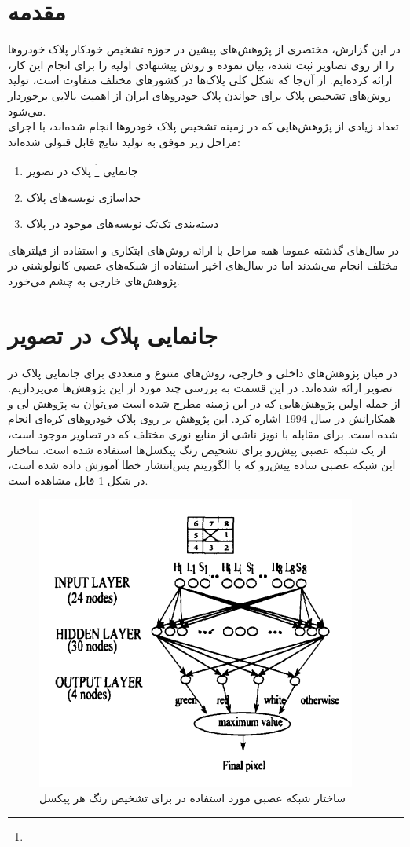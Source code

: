 \documentclass[12pt,a4paper]{article}
\newcommand{\enfootnote}[1]{\footnote{\lr{#1}}}
\begin{document}
\section{مقدمه}
در این گزارش، مختصری از پژوهش‌های پیشین در حوزه تشخیص خودکار پلاک خودروها را از روی تصاویر ثبت شده، بیان نموده و روش پیشنهادی اولیه را برای انجام این کار، ارائه کرده‌ایم. از آن‌جا که شکل کلی پلاک‌ها در کشورهای مختلف متفاوت است، تولید روش‌های تشخیص پلاک برای خواندن پلاک خودروهای ایران از اهمیت بالایی برخوردار می‌شود.
\\
 تعداد زیادی از پژوهش‌هایی که در زمینه تشخیص پلاک خودروها انجام شده‌اند، با اجرای مراحل زیر موفق به تولید نتایج قابل قبولی شده‌اند:
 \begin{enumerate}
 \item جانمایی \enfootnote{Locating} پلاک در تصویر
 \item جداسازی نویسه‌های پلاک
 \item دسته‌بندی تک‌تک نویسه‌های موجود در پلاک
 \end{enumerate}
در سال‌های گذشته عموما همه مراحل با ارائه روش‌های ابتکاری و استفاده از فیلترهای مختلف انجام می‌شدند اما در سال‌های اخیر استفاده از شبکه‌های عصبی کانولوشنی در پژوهش‌های خارجی به چشم می‌خورد.




\section{جانمایی پلاک در تصویر}
در میان پژوهش‌های داخلی و خارجی، روش‌های متنوع و متعددی برای جانمایی پلاک در تصویر ارائه شده‌اند. در این قسمت به بررسی چند مورد از این پژوهش‌ها می‌پردازیم. از جمله اولین پژوهش‌هایی که در این زمینه مطرح شده است می‌توان به پژوهش لی و همکارانش در سال 1994 \cite{lee1994automatic} اشاره کرد. این پژوهش بر روی پلاک خودروهای کره‌ای انجام شده است. برای مقابله با نویز ناشی از منابع نوری مختلف که در تصاویر موجود است، از یک شبکه عصبی پیش‌رو برای تشخیص رنگ پیکسل‌ها استفاده شده است. ساختار این شبکه عصبی ساده پیش‌رو که با الگوریتم پس‌انتشار خطا آموزش داده شده است، در شکل \ref{fig:colorNN} قابل مشاهده است.

\begin{figure}[h]
\centering
\includegraphics[scale=0.4]{Imgs/colorNN.png}
\caption{ساختار شبکه عصبی مورد استفاده در \cite{lee1994automatic} برای تشخیص رنگ هر پیکسل}
\label{fig:colorNN}
\end{figure}
\end{document}
